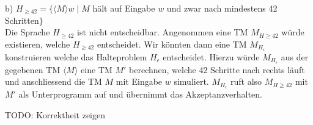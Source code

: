 b) $H_{\geq 42} = \{\langle M \rangle w \mid M$ hält auf Eingabe $w$ und zwar nach mindestens 42 Schritten$\}$\\

Die Sprache $H_{\geq 42}$ ist nicht entscheidbar. Angenommen eine 
TM $M_{H\geq 42}$ würde existieren, welche $H_{\geq 42}$
entscheidet. Wir könnten dann eine TM $M_{H_{\epsilon}}$
konstruieren welche das Halteproblem $H_{\epsilon}$ entscheidet.
Hierzu würde $M_{H_{\epsilon}}$ aus der gegebenen TM $\langle M 
\rangle$ eine TM 
$M'$ berechnen, welche 42 Schritte nach rechts läuft und 
anschliessend die TM $M$ mit Eingabe $w$ simuliert. 
$M_{H_{\epsilon}}$ ruft also $M_{H\geq 42}$ mit $M'$ als 
Unterprogramm auf und übernimmt das Akzeptanzverhalten.


TODO: Korrektheit zeigen



